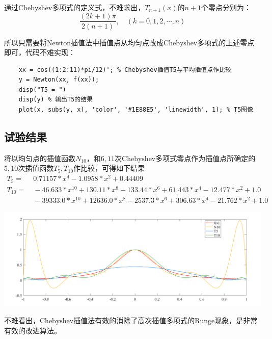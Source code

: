 \documentclass[12pt, a4paper, oneside]{ctexart}
\begin{document}
\begin{appendices}
通过$\text{Chebyshev}$多项式的定义式，不难求出，$T_{n+1}(x)$的$n+1$个零点分别为：
\begin{equation*}
    \frac{(2k+1)\pi}{2(n+1)},\quad(k=0,1,2,\cdots,n)
\end{equation*}

所以只需要将$\text{Newton}$插值法中插值点从均匀点改成$\text{Chebyshev}$多项式的上述零点即可，代码不难实现：

\begin{lstlisting}
    xx = cos((1:2:11)*pi/12)'; % Chebyshev插值T5与平均插值点作比较
    y = Newton(xx, f(xx));
    disp("T5 = ")
    disp(y) % 输出T5的结果
    plot(x, subs(y, x), 'color', '#1E88E5', 'linewidth', 1); % T5图像
\end{lstlisting}

\subsection{试验结果}

将以均匀点的插值函数$N_{10}$，和$6,11$次$\text{Chebyshev}$多项式零点作为插值点所确定的$5,10$次插值函数$T_{5},T_{10}$作比较，可得如下结果
\begin{equation*}
    \begin{aligned}
        T_{5} = &\ 0.71157*x^4 - 1.0958*x^2 + 0.44409\\
        T_{10} =&\ - 46.633*x^{10} + 130.11*x^8 - 133.44*x^6 + 61.443*x^4 - 12.477*x^2  + 1.0\\
        &\ - 39333.0*x^{10} + 12636.0*x^8 - 2537.3*x^6 + 306.63*x^4 - 21.762*x^2 + 1.0
    \end{aligned}
\end{equation*}

\centerline{
    \includegraphics[width=1.2\textwidth]{figure2.png}
}
不难看出，$\text{Chebyshev}$插值法有效的消除了高次插值多项式的$\text{Runge}$现象，是非常有效的改进算法。

\newpage

\end{appendices}
\end{document}
